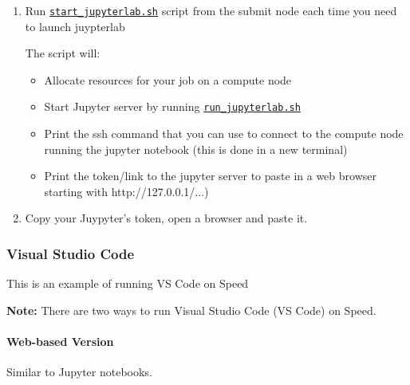 \begin{enumerate}

\item Run \href{https://github.com/NAG-DevOps/speed-hpc/blob/master/src/jupyter/jupyterlabs-pyenv/start_jupyterlab.sh}{\texttt{start\_jupyterlab.sh}} script from the submit node each time you need to launch juypterlab

The script will:
\begin{itemize}
    \item Allocate resources for your job on a compute node
    \item Start Jupyter server by running \href{https://github.com/NAG-DevOps/speed-hpc/blob/master/src/jupyter/jupyterlabs-pyenv/run_jupyterlab.sh}{\texttt{run\_jupyterlab.sh}}
    \item Print the ssh command that you can use to connect to the compute node running the jupyter notebook (this is done in a new terminal)
    \item Print the token/link to the jupyter server to paste in a web browser starting with http://127.0.0.1/...)
\end{itemize}

\item Copy your Juypyter's token, open a browser and paste it.
 
\end{enumerate}

\subsubsection{Visual Studio Code}
\label{sect:vscode}

This is an example of running VS Code on Speed

\textbf{Note: } There are two ways to run Visual Studio Code (VS Code) on Speed.

\paragraph{Web-based Version}
\label{sect:web-based-vscode}
Similar to Jupyter notebooks.


